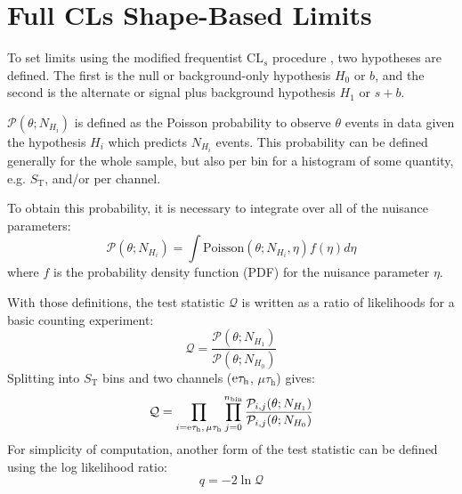 \documentclass[12pt]{thesis}  %
\newcommand{\tauh}{\ensuremath{\tau_{\text{h}}}\xspace}
\newcommand{\Pe}{\ensuremath{\cmsSymbolFace{e}}\xspace}
\newcommand{\mutau}{\ensuremath{\mu\tauh}\xspace}
\newcommand{\etau}{\ensuremath{\Pe\tauh}\xspace}
\def\ST{\ensuremath{S_{\text{T}}}\xspace}
\begin{document}
\chapter{Full CLs Shape-Based Limits
\label{ch:limits}}

To set limits using the modified frequentist $\text{CL}_{s}$ procedure \cite{Read:CLs}, two hypotheses are defined. The first is the null or background-only hypothesis $H_{0}$ or $b$, and the second is the alternate or signal plus background hypothesis $H_{1}$ or $s+b$.

$\mathcal{P}(\theta; N_{H_{i}})$ is defined as the Poisson probability to observe $\theta$ events in data given the hypothesis $H_{i}$ which predicts $N_{H_{i}}$ events. This probability can be defined generally for the whole sample, but also per bin for a histogram of some quantity, e.g. \ST, and/or per channel.

To obtain this probability, it is necessary to integrate over all of the nuisance parameters:
\begin{equation}
\mathcal{P}(\theta; N_{H_{i}}) = \int \mbox{Poisson}(\theta; N_{H_{i}},\eta)f(\eta)d\eta
\end{equation}
where $f$ is the probability density function (PDF) for the nuisance parameter $\eta$.

With those definitions, the test statistic $\mathcal{Q}$ is written as a ratio of likelihoods for a basic counting experiment:
\begin{equation}
\mathcal{Q} = \frac{\mathcal{P}(\theta; N_{H_{1}})}{\mathcal{P}(\theta; N_{H_{0}})}
\end{equation}
Splitting into \ST bins and two channels (\etau, \mutau) gives:
\begin{equation}
\mathcal{Q} = \prod_{i=\etau,\,\mutau}\prod_{j=0}^{n_{\text{bin}}} \frac{\mathcal{P}_{i,j}(\theta; N_{H_{1}})}{\mathcal{P}_{i,j}(\theta; N_{H_{0}})}
\end{equation}
For simplicity of computation, another form of the test statistic can be defined using the log likelihood ratio:
\begin{equation}
q = -2 \ln \mathcal{Q}
\end{equation}
\end{document}
